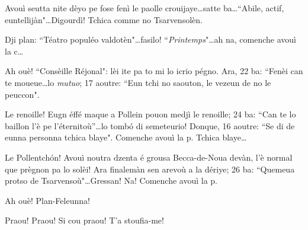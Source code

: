 


\DramPer


 

\begin{drama}

\Laurentspeaks Avouì seutta nite dèyo pe fose fenì le paolle crouijaye\ldots satte ba\ldots ``Abile, actif, euntellijàn"\ldots Digourdì! Tchica comme no Tsarvensolèn.


\Laurentspeaks Dji plan: ``Téatro populéo valdotèn"\ldots fasilo! ``\textit{Printemps}"\ldots ah na, comenche avouì la c\ldots


\Laurentspeaks Ah ouè! ``Consèille Réjonal": lèi ite pa to mi lo icrio pégno. Ara, 22 ba: ``Fenèi can te moueue\ldots lo \textit{mutuo}; 17 aoutre: ``Eun tchi no saouton, le vezeun de no le peuccon".


\Laurentspeaks Le renoille! Eugn éffé maque a Pollein pouon medjì le renoille; 24 ba: ``Can te lo baillon l'è pe l'éternitoù''\ldots lo tomb\'o di semeteurio! Donque, 16 aoutre: ``Se di de eunna personna tchica blaye". Comenche avouì la p. Tchica blaye\ldots


\Laurentspeaks Le Pollentch\'on! Avouì noutra dzenta é grousa Becca-de-Noua devàn, l'è normal que prègnon pa lo solèi! Ara finalemàn sen arevoù a la dériye; 26 ba: ``Quemeua protso de Tsarvensoù"\ldots Gressan! Na! Comenche avouì la p.


\Laurentspeaks Ah ouè! Plan-Feleunna!


\Taniaspeaks{} Praou! Praou! Si cou praou! T'a stoufia-me!


\end{drama}
